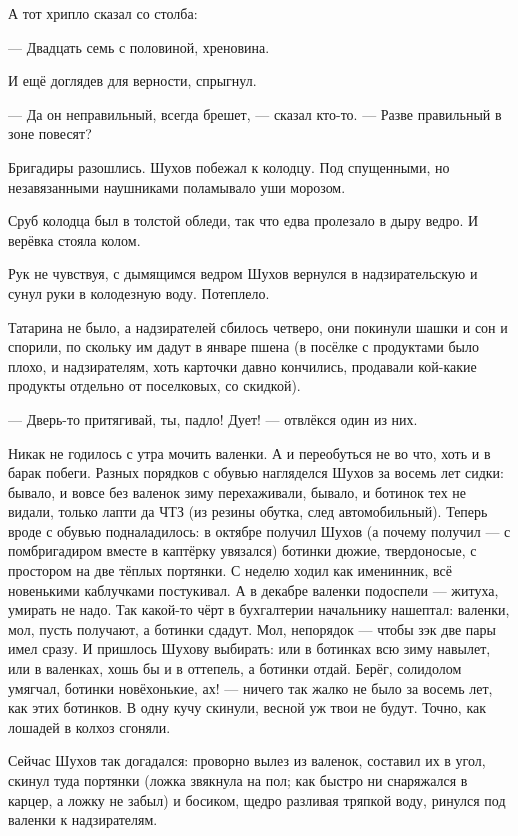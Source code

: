 А тот хрипло сказал со столба:

--- Двадцать семь с половиной, хреновина.

И ещё доглядев для верности, спрыгнул.

--- Да он неправильный, всегда брешет, --- сказал кто-то. --- Разве правильный в зоне повесят?

Бригадиры разошлись. Шухов побежал к колодцу. Под спущенными, но незавязанными наушниками 
поламывало уши морозом.

Сруб колодца был в толстой обледи, так что едва пролезало в дыру ведро. И верёвка стояла 
колом.

Рук не чувствуя, с дымящимся ведром Шухов вернулся в надзирательскую и сунул руки в 
колодезную воду. Потеплело.

Татарина не было, а надзирателей сбилось четверо, они покинули шашки и сон и спорили, по 
скольку им дадут в январе пшена (в посёлке с продуктами было плохо, и надзирателям, хоть 
карточки давно кончились, продавали кой-какие продукты отдельно от поселковых, со скидкой).

--- Дверь-то притягивай, ты, падло! Дует! --- отвлёкся один из них.

Никак не годилось с утра мочить валенки. А и переобуться не во что, хоть и в барак побеги. 
Разных порядков с обувью нагляделся Шухов за восемь лет сидки: бывало, и вовсе без валенок 
зиму перехаживали, бывало, и ботинок тех не видали, только лапти да ЧТЗ (из резины обутка, 
след автомобильный). Теперь вроде с обувью подналадилось: в октябре получил Шухов (а почему 
получил --- с помбригадиром вместе в каптёрку увязался) ботинки дюжие, твердоносые, с 
простором на две тёплых портянки. С неделю ходил как именинник, всё новенькими каблучками 
постукивал. А в декабре валенки подоспели --- житуха, умирать не надо. Так какой-то чёрт в 
бухгалтерии начальнику нашептал: валенки, мол, пусть получают, а ботинки сдадут. Мол, 
непорядок --- чтобы зэк две пары имел сразу. И пришлось Шухову выбирать: или в ботинках всю 
зиму навылет, или в валенках, хошь бы и в оттепель, а ботинки отдай. Берёг, солидолом умягчал, 
ботинки новёхонькие, ах! --- ничего так жалко не было за восемь лет, как этих ботинков. В одну 
кучу скинули, весной уж твои не будут. Точно, как лошадей в колхоз сгоняли.

Сейчас Шухов так догадался: проворно вылез из валенок, составил их в угол, скинул туда 
портянки (ложка звякнула на пол; как быстро ни снаряжался в карцер, а ложку не забыл) и 
босиком, щедро разливая тряпкой воду, ринулся под валенки к надзирателям.

